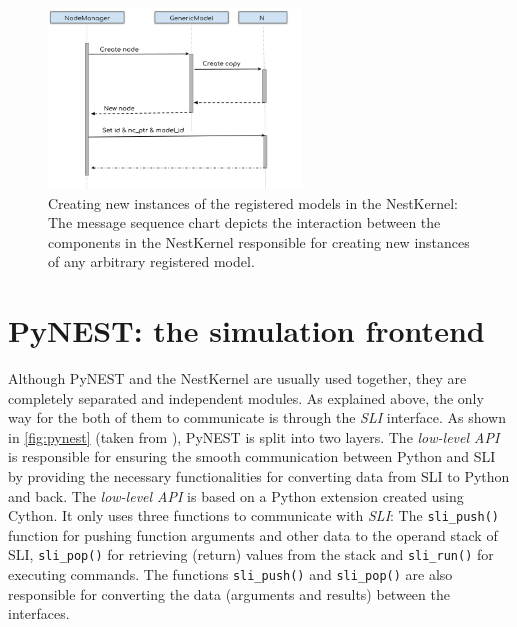 \begin{figure}[ht!]
\centering
\includegraphics[width=0.6\textwidth]{src/pic/nodes_creation.png}
\caption{Creating new instances of the registered models in the NestKernel: The message sequence chart depicts the interaction between the components in the NestKernel responsible for creating new instances of any arbitrary registered model.}
\label{fig:nestkernel_creation}
\end{figure}

\section{PyNEST: the simulation frontend}

Although PyNEST and the NestKernel are usually used together, they are completely separated and independent modules. As explained above, the only way for the both of them to communicate is through the \emph{SLI} interface. As shown in \autoref{fig:pynest} (taken from \citet{epp}), PyNEST is split into two layers. The \emph{low-level API} is responsible for ensuring the smooth communication between Python and SLI by providing the necessary functionalities for converting data from SLI to Python and back. The \emph{low-level API} is based on a Python extension created using Cython. It only uses three functions to communicate with \emph{SLI}: The \texttt{sli\_push()} function for pushing function arguments and other data to the operand stack of SLI, \texttt{sli\_pop()} for retrieving (return) values from the stack and \texttt{sli\_run()} for executing commands. The functions \texttt{sli\_push()} and \texttt{sli\_pop()} are also responsible for converting the data (arguments and results) between the interfaces.


